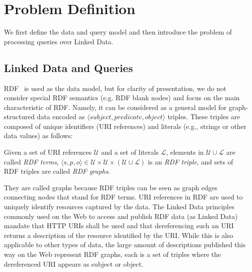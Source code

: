 \section{Problem Definition}
\label{sec:problem}
We first define the data and query model and then
introduce the problem of processing queries over Linked Data.

\subsection{Linked Data and Queries} 
RDF~\cite{klyne_resource_2004} is used
as the data model, but for clarity of presentation, we do not consider
special RDF semantics (e.g. RDF blank nodes) and focus on the main characteristic of RDF. 
Namely, it can be considered as a general model for
graph-structured data encoded as $\langle subject, predicate, object
\rangle$ triples. These triples are composed of unique identifiers
(URI references) and literals (e.g., strings or other data values) as
follows:


\begin{definition}
  Given a set of URI references $\mathcal{U}$ and a set of literals
  $\mathcal{L}$, elements in $\mathcal{U} \cup
  \mathcal{L}$ are called \emph{RDF terms},
  $\langle s, p, o\rangle \in \mathcal{U}
  \times \mathcal{U} \times (\mathcal{U} \cup \mathcal{L})$ is 
  an \emph{RDF triple}, and sets of RDF triples are called
  \emph{RDF graphs}.
\end{definition}

They are called graphs because RDF triples can be seen 
as graph edges connecting nodes that stand for RDF terms. URI references in RDF are used to uniquely identify resources captured by the data. 
The Linked Data principles \cite{bizer_linked_2009} commonly used on the Web to access and publish RDF data (as Linked Data) mandate
that HTTP URIs shall be used and that dereferencing such an URI returns a
description of the resource identified by the URI. While this is also applicable to other types of data, 
the large amount of descriptions published this way on the Web represent RDF graphs, each is a set of triples where the dereferenced URI appears as subject or object.

